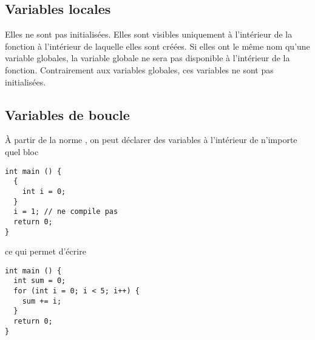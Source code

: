 \subsection{Variables locales}
Elles ne sont pas initialisées.
Elles sont visibles uniquement à l'intérieur de la fonction à l'intérieur
de laquelle elles sont créées.
Si elles ont le même nom qu'une variable globales,
la variable globale ne sera pas disponible à l'intérieur de la fonction.
Contrairement aux variables globales, ces variables ne sont pas
initialisées.

\subsection{Variables de boucle}
À partir de la norme ,
on peut déclarer des variables à l'intérieur
de n'importe quel bloc
\begin{lstlisting}
int main () {
  {
    int i = 0;
  }
  i = 1; // ne compile pas
  return 0;
}
\end{lstlisting}
ce qui permet d'écrire
\begin{lstlisting}
int main () {
  int sum = 0;
  for (int i = 0; i < 5; i++) {
    sum += i;
  }
  return 0;
}
\end{lstlisting}


%





